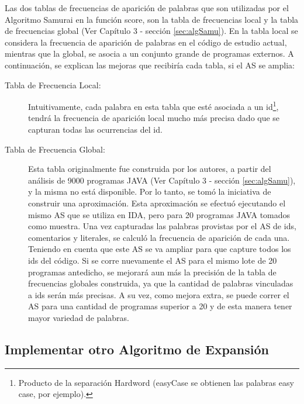 Las dos tablas de frecuencias de aparición de palabras que son utilizadas por el Algoritmo Samurai en la función score, son la tabla de frecuencias local y la tabla de frecuencias global (Ver Capítulo 3 - sección \ref{sec:algSamu}). 
En la tabla local se considera la frecuencia de aparición de palabras en el código de estudio actual, mientras que la global, se asocia a un conjunto grande de programas externos. A continuación, se explican las mejoras que recibiría cada tabla, si el AS se amplia:

\begin{description}
\item[Tabla de Frecuencia Local:] Intuitivamente, cada palabra en esta tabla que esté asociada a un id\footnote[1]{Producto de la separación Hardword (\textsf{easyCase} se obtienen las palabras \textsf{easy case}, por ejemplo).}, tendrá la frecuencia de aparición local mucho más precisa dado que se capturan todas las ocurrencias del id.

\item[Tabla de Frecuencia Global:] Esta tabla originalmente fue construida por los autores, a partir del análisis de 9000 programas JAVA (Ver Capítulo 3 - sección \ref{sec:algSamu}), y la misma no está disponible. Por lo tanto, se tomó la iniciativa de construir una aproximación. Esta aproximación se efectuó ejecutando el mismo AS que se utiliza en IDA, pero para 20 programas JAVA tomados como muestra. Una vez capturadas las palabras provistas por el AS de ids, comentarios y literales, se calculó la frecuencia de aparición de cada una.
Teniendo en cuenta que este AS se va ampliar para que capture todos los ids del código. Si se corre nuevamente el AS para el mismo lote de 20 programas antedicho, se mejorará aun más la precisión de la tabla de frecuencias globales construida, ya que la cantidad de palabras vinculadas a ids serán más precisas. A su vez, como mejora extra, se puede correr el AS para una cantidad de programas superior a 20 y de esta manera tener mayor variedad de palabras.

\end{description}

 
\subsection{Implementar otro Algoritmo de Expansión}

